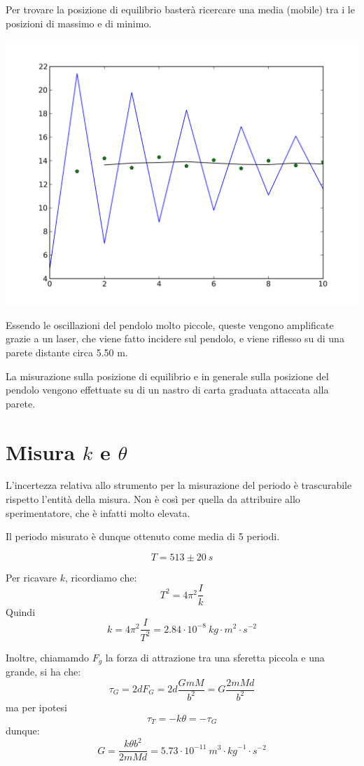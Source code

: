 Per trovare la posizione di equilibrio basterà ricercare una media (mobile) tra i le posizioni di massimo e di minimo.

\begin{center}
 \includegraphics[scale=0.50]{../grafici/cavendish/oscillazioni.png}
\end{center}

Essendo le oscillazioni del pendolo molto piccole, queste vengono amplificate grazie a un laser, che viene fatto incidere sul pendolo, e viene riflesso su di una parete distante circa 5.50 m.

La misurazione sulla posizione di equilibrio e in generale sulla posizione del pendolo vengono effettuate su di un nastro di carta graduata attaccata alla parete.


\section[Misura di k e theta]{Misura $k$ e $\theta$}
L'incertezza relativa allo strumento per la misurazione del periodo è trascurabile rispetto l'entità della misura. Non è così per quella da attribuire allo sperimentatore, che è infatti molto elevata.

Il periodo misurato è dunque ottenuto come media di 5 periodi.

$$T = 513 \pm 20 \ s$$

Per ricavare $k$, ricordiamo che:
$$T^2 = 4 \pi^2 \frac{I}{k}$$
Quindi
$$k = 4 \pi^2 \frac{I}{T^2} = 2.84 \cdot 10^{-8}\ kg\cdot m^2\cdot{s}^{-2}$$

Inoltre, chiamamdo $F_g$ la forza di attrazione tra una sferetta piccola e una grande, si ha che:
$$ \tau_G = 2dF_G = 2d\frac{GmM}{b^2} = G\frac{2mMd}{b^2} $$
ma per ipotesi
$$ \tau_T = -k\theta = -\tau_G $$
dunque:
$$G = \frac{k \theta b^2}{2mMd} = 5.73 \cdot 10^{-11}\ {m}^3\cdot {kg}^{-1}\cdot{s}^{-2}$$

